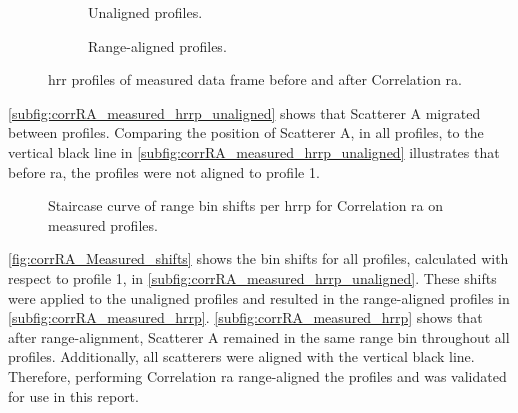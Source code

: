 \documentclass[class=report,11pt,crop=false]{standalone}
\begin{document}
    \begin{figure}[H]
        \centering
        \begin{subfigure}{0.4\linewidth}
                \centering
                \resizebox{\linewidth}{!}{}
                \caption{Unaligned profiles.\label{subfig:corrRA_measured_hrrp_unaligned}}
        \end{subfigure}
        \hspace{1cm}
        \begin{subfigure}{0.4\linewidth}
                \centering
                \resizebox{\linewidth}{!}{}
                \caption{Range-aligned profiles.\label{subfig:corrRA_measureed_hrrp}}
        \end{subfigure}
        \caption{\gls{hrr} profiles of measured data frame before and after Correlation \gls{ra}. \label{fig:corrRA_measured}}
    \end{figure}

    \autoref{subfig:corrRA_measured_hrrp_unaligned} shows that Scatterer A migrated between profiles. Comparing the position of Scatterer A, in all profiles, to the vertical black line in \autoref{subfig:corrRA_measured_hrrp_unaligned} illustrates that before \gls{ra}, the profiles were not aligned to profile 1.
    
    \begin{figure}[H]
        \centering
        \resizebox{0.4\linewidth}{!}{}
        \caption{Staircase curve of range bin shifts per \gls{hrrp} for Correlation \gls{ra} on measured profiles.}\label{fig:corrRA_Measured_shifts}
    \end{figure}
    
    \autoref{fig:corrRA_Measured_shifts} shows the bin shifts for all profiles, calculated with respect to profile 1, in \autoref{subfig:corrRA_measured_hrrp_unaligned}. These shifts were applied to the unaligned profiles and resulted in the range-aligned profiles in \autoref{subfig:corrRA_measured_hrrp}. \autoref{subfig:corrRA_measured_hrrp} shows that after range-alignment, Scatterer A remained in the same range bin throughout all profiles. Additionally, all scatterers were aligned with the vertical black line. Therefore, performing Correlation \gls{ra} range-aligned the profiles and was validated for use in this report.
    
\end{document}
